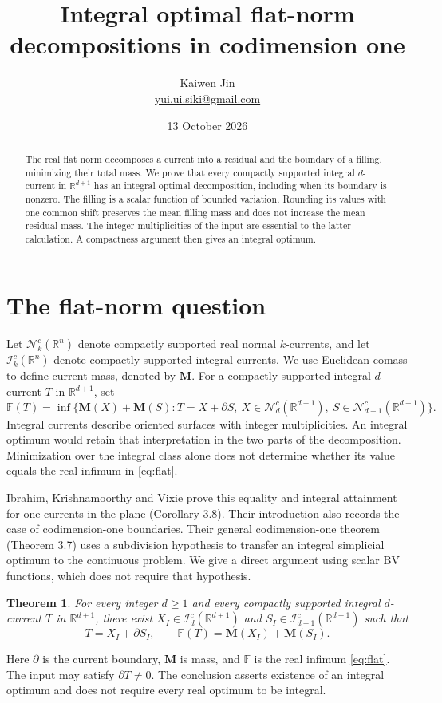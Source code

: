 \documentclass[11pt]{article}
\title{Integral optimal flat-norm decompositions in codimension one}
\author{Kaiwen Jin\\\small\href{mailto:yui.ui.siki@gmail.com}{yui.ui.siki@gmail.com}}
\date{13 October 2026}
\newtheorem{theorem}{Theorem}
\newcommand{\R}{\mathbb R}
\newcommand{\M}{\mathbf M}
\newcommand{\F}{\mathbb F}
\begin{document}
\maketitle
\begin{abstract}
The real flat norm decomposes a current into a residual and the boundary of
a filling, minimizing their total mass. We prove that every compactly
supported integral $d$-current in $\R^{d+1}$ has an integral optimal
decomposition, including when its boundary is nonzero. The filling is a
scalar function of bounded variation. Rounding its values with one common
shift preserves the mean filling mass and does not increase the mean residual
mass. The integer multiplicities of the input are essential to the latter
calculation. A compactness argument then gives an integral optimum.
\end{abstract}

\section{The flat-norm question}
Let $\mathcal N_k^c(\R^n)$ denote compactly supported real normal $k$-currents,
and let $\mathcal I_k^c(\R^n)$ denote compactly supported integral currents.
We use Euclidean comass to define current mass, denoted by $\M$.
For a compactly supported integral $d$-current $T$ in $\R^{d+1}$, set
\begin{equation}\label{eq:flat}
\F(T)=\inf\bigl\{\M(X)+\M(S):
T=X+\partial S,\ X\in\mathcal N_d^c(\R^{d+1}),\
S\in\mathcal N_{d+1}^c(\R^{d+1})\bigr\}.
\end{equation}
Integral currents describe oriented surfaces with integer multiplicities.
An integral optimum would retain that interpretation in the two parts of the
decomposition. Minimization over the integral class alone does not determine
whether its value equals the real infimum in \eqref{eq:flat}.

Ibrahim, Krishnamoorthy and Vixie \cite{IKV} prove this equality and integral
attainment for one-currents in the plane (Corollary 3.8). Their introduction
also records the case of codimension-one boundaries. Their general
codimension-one theorem (Theorem 3.7) uses a subdivision hypothesis to
transfer an integral simplicial optimum to the continuous problem. We give
a direct argument using scalar BV functions, which does not require that
hypothesis.

\begin{theorem}\label{thm:main}
For every integer $d\ge1$ and every compactly supported integral $d$-current
$T$ in $\R^{d+1}$, there exist
$X_I\in\mathcal I_d^c(\R^{d+1})$ and
$S_I\in\mathcal I_{d+1}^c(\R^{d+1})$ such that
\[
T=X_I+\partial S_I,\qquad
\F(T)=\M(X_I)+\M(S_I).
\]
\end{theorem}
Here $\partial$ is the current boundary, $\M$ is mass, and $\F$ is the real
infimum \eqref{eq:flat}. The input may satisfy $\partial T\ne0$.
The conclusion asserts existence of an integral optimum and does not require
every real optimum to be integral.
\end{document}
